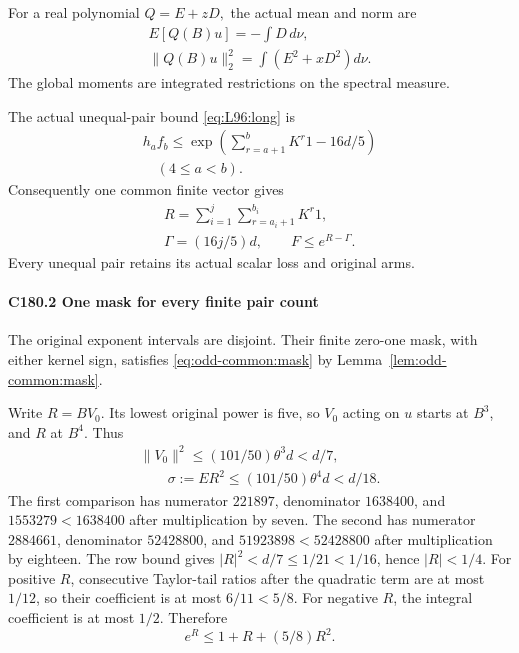 For a real polynomial \(Q=E+zD,\allowbreak \) the actual mean and norm are
\[
\begin{gathered}
E[Q(B)u]=-\int D\,d\nu,\qquad\\
\|Q(B)u\|_2^2=\int(E^2+xD^2)d\nu.
\end{gathered}\tag{C180.8}
\]
The global moments are integrated restrictions on the spectral measure.

The actual unequal-pair bound \eqref{eq:L96:long} is
\[
\begin{gathered}
h_a f_b\le\exp\left(\sum_{r=a+1}^bK^r1-16d/5\right)\\
\quad(4\le a<b).
\end{gathered}\tag{C180.9}
\]
Consequently one common finite vector gives
\[
\begin{gathered}
R=\sum_{i=1}^j\sum_{r=a_i+1}^{b_i}K^r1,\qquad\\
\Gamma=(16j/5)d,\qquad F\le e^{R-\Gamma}.
\end{gathered}\tag{C180.10}
\]
Every unequal pair retains its actual scalar loss and original arms.

\paragraph{C180.2 One mask for every finite pair count}

The original exponent intervals are disjoint. Their finite zero-one
mask, with either kernel sign, satisfies
\eqref{eq:odd-common:mask} by Lemma~\ref{lem:odd-common:mask}.

Write \(R=BV_0\). Its lowest original power is five, so \(V_0\) acting on \(u\) starts at \(B^3\), and \(R\) at \(B^4\). Thus
\[
\begin{gathered}
\|V_0\|^2\le(101/50)\theta^3d<d/7,\\
\qquad \sigma:=ER^2\le(101/50)\theta^4d<d/18.
\end{gathered}\tag{C180.12}
\]
The first comparison has numerator \(221897\), denominator \(1638400\), and \(1553279<1638400\) after multiplication by seven. The second has numerator \(2884661\), denominator \(52428800\), and \(51923898<52428800\) after multiplication by eighteen. The row bound gives \(|R|^2<d/7\le1/21<1/16\), hence \(|R|<1/4\). For positive \(R\), consecutive Taylor-tail ratios after the quadratic term are at most \(1/12\), so their coefficient is at most \(6/11<5/8\). For negative \(R\), the integral coefficient is at most \(1/2\). Therefore
\[
 e^R\le1+R+(5/8)R^2.                                \tag{C180.13}
\]

